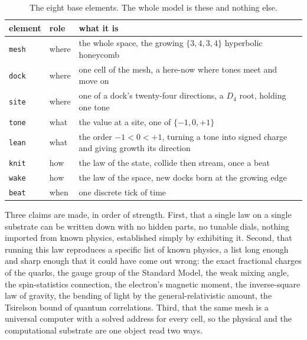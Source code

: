 \begin{table}[ht]
\centering
\small
\begin{tabularx}{\textwidth}{@{}llX@{}}
\toprule
element & role & what it is \\
\midrule
\texttt{mesh} & where & the whole space, the growing $\{3,4,3,4\}$ hyperbolic honeycomb \\
\texttt{dock} & where & one cell of the mesh, a here-now where tones meet and move on \\
\texttt{site} & where & one of a dock's twenty-four directions, a $D_4$ root, holding one tone \\
\texttt{tone} & what & the value at a site, one of $\{-1, 0, +1\}$ \\
\texttt{lean} & what & the order $-1 < 0 < +1$, turning a tone into signed charge and giving growth its direction \\
\texttt{knit} & how & the law of the state, collide then stream, once a beat \\
\texttt{wake} & how & the law of the space, new docks born at the growing edge \\
\texttt{beat} & when & one discrete tick of time \\
\bottomrule
\end{tabularx}
\caption{The eight base elements. The whole model is these and nothing else.}
\label{tab:elements}
\end{table}

Three claims are made, in order of strength. First, that a single law on a single substrate can be written down with no hidden parts, no tunable dials, nothing imported from known physics, established simply by exhibiting it. Second, that running this law reproduces a specific list of known physics, a list long enough and sharp enough that it could have come out wrong: the exact fractional charges of the quarks, the gauge group of the Standard Model, the weak mixing angle, the spin-statistics connection, the electron's magnetic moment, the inverse-square law of gravity, the bending of light by the general-relativistic amount, the Tsirelson bound of quantum correlations. Third, that the same mesh is a universal computer with a solved address for every cell, so the physical and the computational substrate are one object read two ways.

